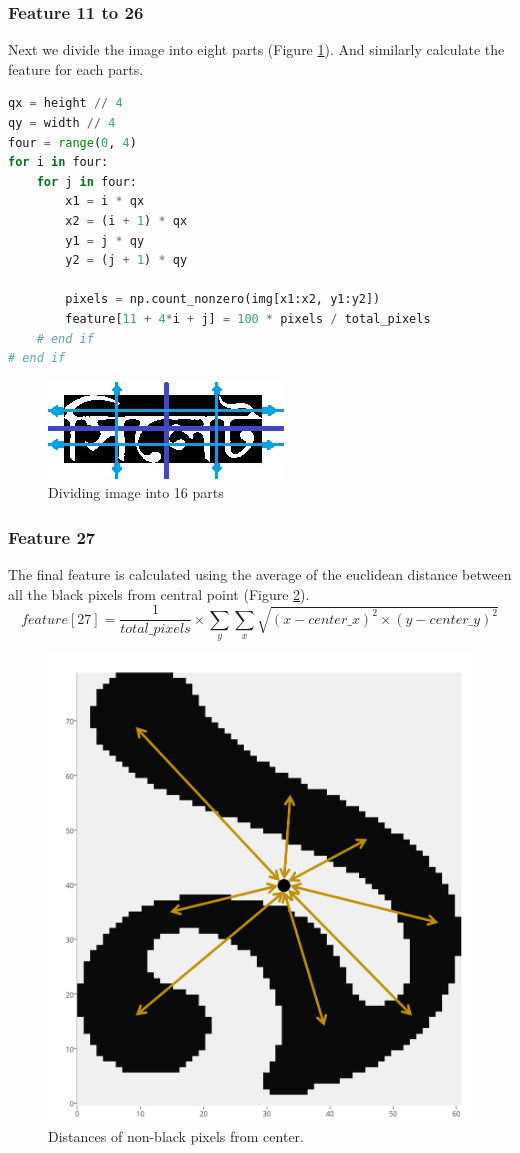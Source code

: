 \documentclass{standalone}
\begin{document}
\subsubsection{Feature 11 to 26}
Next we divide the image into eight parts (Figure \ref{fig:FeatureEights}). And similarly calculate the feature for each parts.
\begin{lstlisting}[language=Python]
qx = height // 4
qy = width // 4
four = range(0, 4)
for i in four:
    for j in four:
        x1 = i * qx
        x2 = (i + 1) * qx
        y1 = j * qy
        y2 = (j + 1) * qy

        pixels = np.count_nonzero(img[x1:x2, y1:y2])
        feature[11 + 4*i + j] = 100 * pixels / total_pixels
    # end if
# end if
\end{lstlisting}

\begin{figure}
\centering
\includegraphics{./img/feature/eights}
\caption{Dividing image into 16 parts}
\label{fig:FeatureEights}
\end{figure}

\subsubsection{Feature 27}
The final feature is calculated using the average of the euclidean distance between all the black pixels from central point (Figure \ref{fig:FeatureDist}).
\begin{equation}
feature[27] = \dfrac{1}{total\_pixels} \times \sum_{y}{\sum_{x}{ \sqrt{(x-center\_x)^2 \times (y-center\_y)^2} }}
\end{equation}


\begin{figure}
\centering
\includegraphics[width=0.9\linewidth]{./img/feature/dist}
\caption{Distances of non-black pixels from center.}
\label{fig:FeatureDist}
\end{figure}
\end{document}
